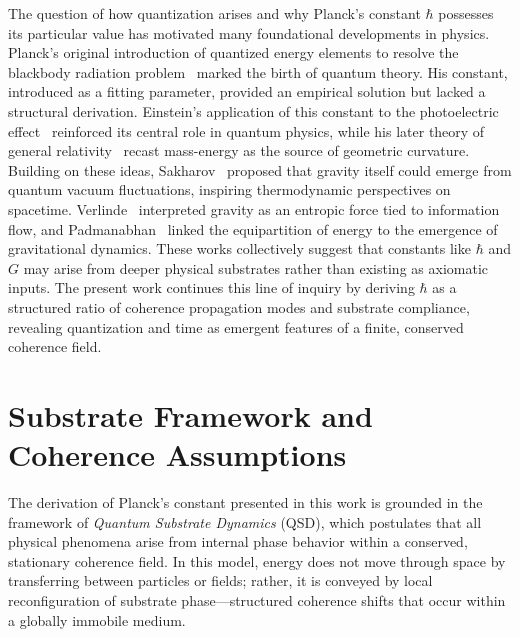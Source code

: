 \documentclass[ht-mathphys]{ht-fmt}
\theoremstyle{thmstyleone}%
\theoremstyle{thmstyletwo}%
\theoremstyle{thmstylethree}%
\begin{document}
The question of how quantization arises and why Planck’s constant $\hbar$ possesses its particular value has motivated many foundational developments in physics. Planck’s original introduction of quantized energy elements to resolve the blackbody radiation problem~\cite{planck1901} marked the birth of quantum theory. His constant, introduced as a fitting parameter, provided an empirical solution but lacked a structural derivation. Einstein’s application of this constant to the photoelectric effect~\cite{einstein1905} reinforced its central role in quantum physics, while his later theory of general relativity~\cite{einstein1915} recast mass-energy as the source of geometric curvature. Building on these ideas, Sakharov~\cite{sakharov1967} proposed that gravity itself could emerge from quantum vacuum fluctuations, inspiring thermodynamic perspectives on spacetime. Verlinde~\cite{verlinde2011} interpreted gravity as an entropic force tied to information flow, and Padmanabhan~\cite{padmanabhan2010} linked the equipartition of energy to the emergence of gravitational dynamics. These works collectively suggest that constants like $\hbar$ and $G$ may arise from deeper physical substrates rather than existing as axiomatic inputs. The present work continues this line of inquiry by deriving $\hbar$ as a structured ratio of coherence propagation modes and substrate compliance, revealing quantization and time as emergent features of a finite, conserved coherence field.


\section{Substrate Framework and Coherence Assumptions}
\label{sec:substrateframework}
The derivation of Planck’s constant presented in this work is grounded in the framework of \textit{Quantum Substrate Dynamics} (QSD), which postulates that all physical phenomena arise from internal phase behavior within a conserved, stationary coherence field. In this model, energy does not move through space by transferring between particles or fields; rather, it is conveyed by local reconfiguration of substrate phase—structured coherence shifts that occur within a globally immobile medium.
\end{document}
